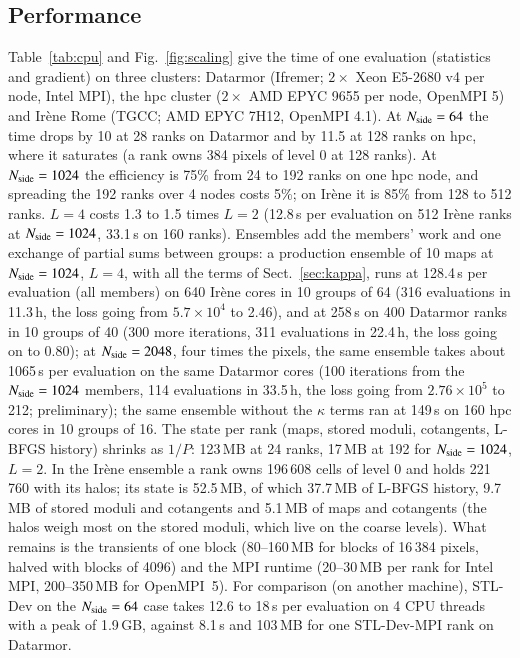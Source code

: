 \documentclass{aa}
\newcommand{\nside}{N_{\rm side}}
\begin{document}
\subsection{Performance}
\label{sec:performance}

Table~\ref{tab:cpu} and Fig.~\ref{fig:scaling} give the time of one evaluation (statistics and gradient) on three clusters: Datarmor (Ifremer; $2\times$ Xeon E5-2680 v4 per node, Intel MPI), the hpc cluster ($2\times$ AMD EPYC 9655 per node, OpenMPI 5) and Ir\`ene Rome (TGCC; AMD EPYC 7H12, OpenMPI 4.1). At $\nside=64$ the time drops by 10 at 28 ranks on Datarmor and by 11.5 at 128 ranks on hpc, where it saturates (a rank owns 384 pixels of level 0 at 128 ranks). At $\nside=1024$ the efficiency is 75\% from 24 to 192 ranks on one hpc node, and spreading the 192 ranks over 4 nodes costs 5\%; on Ir\`ene it is 85\% from 128 to 512 ranks. $L=4$ costs 1.3 to 1.5 times $L=2$ (12.8\,s per evaluation on 512 Ir\`ene ranks at $\nside=1024$, 33.1\,s on 160 ranks). Ensembles add the members' work and one exchange of partial sums between groups: a production ensemble of 10 maps at $\nside=1024$, $L=4$, with all the terms of Sect.~\ref{sec:kappa}, runs at 128.4\,s per evaluation (all members) on 640 Ir\`ene cores in 10 groups of 64 (316 evaluations in 11.3\,h, the loss going from $5.7\times10^4$ to 2.46), and at 258\,s on 400 Datarmor ranks in 10 groups of 40 (300 more iterations, 311 evaluations in 22.4\,h, the loss going on to 0.80); at $\nside=2048$, four times the pixels, the same ensemble takes about 1065\,s per evaluation on the same Datarmor cores (100 iterations from the $\nside=1024$ members, 114 evaluations in 33.5\,h, the loss going from $2.76\times10^5$ to 212; preliminary); the same ensemble without the $\kappa$ terms ran at 149\,s on 160 hpc cores in 10 groups of 16. The state per rank (maps, stored moduli, cotangents, L-BFGS history) shrinks as $1/P$: 123\,MB at 24 ranks, 17\,MB at 192 for $\nside=1024$, $L=2$. In the Ir\`ene ensemble a rank owns 196\,608 cells of level 0 and holds 221\,760 with its halos; its state is 52.5\,MB, of which 37.7\,MB of L-BFGS history, 9.7\,MB of stored moduli and cotangents and 5.1\,MB of maps and cotangents (the halos weigh most on the stored moduli, which live on the coarse levels). What remains is the transients of one block (80--160\,MB for blocks of 16\,384 pixels, halved with blocks of 4096) and the MPI runtime (20--30\,MB per rank for Intel MPI, 200--350\,MB for OpenMPI~5). For comparison (on another machine), STL-Dev on the $\nside=64$ case takes 12.6 to 18\,s per evaluation on 4 CPU threads with a peak of 1.9\,GB, against 8.1\,s and 103\,MB for one STL-Dev-MPI rank on Datarmor.
\end{document}
